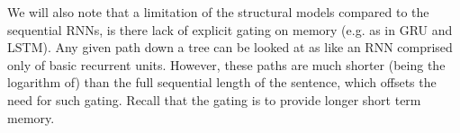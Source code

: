 \documentclass[12pt,parskip]{komatufte}
\begin{document}
We will also note that a limitation of the structural models compared to the sequential RNNs,
is there lack of explicit gating on memory (e.g. as in GRU and LSTM).
Any given path down a tree can be looked at as like an RNN comprised only of basic recurrent units.
However, these paths are much shorter (being the logarithm of) than the full sequential length of the sentence,
which offsets the need for such gating.
Recall that the gating is to provide longer short term memory.
\end{document}
